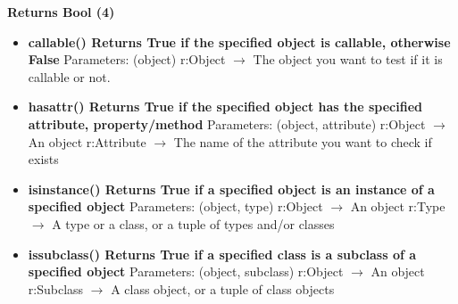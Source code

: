 \documentclass{report}
\begin{document}
      \begin{center}
        \textbf{Returns Bool (4)}
      \end{center}
      \begin{itemize}
        \item[\ding{43}] \textbf{callable()	Returns True if the specified object is callable, otherwise False}
          \smallbreak \noindent
          Parameters: (object)
          \smallbreak \noindent
          r:Object $\rightarrow$ 	The object you want to test if it is callable or not.
          \smallbreak \noindent
        \item[\ding{43}] \textbf{hasattr() Returns True if the specified object has the specified attribute, property/method}
          \smallbreak \noindent
          Parameters: (object, attribute)
          \smallbreak \noindent
          r:Object $\rightarrow$ An object
          \smallbreak \noindent
          r:Attribute $\rightarrow$	The name of the attribute you want to check if exists
          \smallbreak \noindent
        \item[\ding{43}] \textbf{isinstance()	Returns True if a specified object is an instance of a specified object}
          \smallbreak \noindent
          Parameters: (object, type)
          \smallbreak \noindent
          r:Object $\rightarrow$ An object 
          \smallbreak \noindent
          r:Type $\rightarrow$ 	A type or a class, or a tuple of types and/or classes
          \smallbreak \noindent
        \item[\ding{43}] \textbf{issubclass()	Returns True if a specified class is a subclass of a specified object}
          \smallbreak \noindent
          Parameters: (object, subclass)
          \smallbreak \noindent
          r:Object $\rightarrow$ An object
          \smallbreak \noindent
          r:Subclass $\rightarrow$ 	A class object, or a tuple of class objects
          \smallbreak \noindent
      \end{itemize}
    

    \bigbreak \noindent 
    
\end{document}
